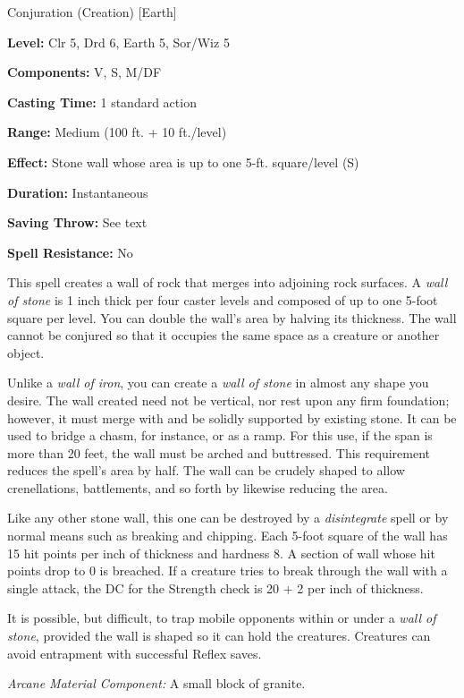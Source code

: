 
Conjuration (Creation) [Earth]

\textbf{Level:} Clr 5, Drd 6, Earth 5, Sor/Wiz 5

\textbf{Components:} V, S, M/DF

\textbf{Casting Time:} 1 standard action

\textbf{Range:} Medium (100 ft. + 10 ft./level)

\textbf{Effect:} Stone wall whose area is up to one 5-ft. square/level (S)

\textbf{Duration:} Instantaneous

\textbf{Saving Throw:} See text

\textbf{Spell Resistance:} No

This spell creates a wall of rock that merges into adjoining rock surfaces. A \textit{wall 
of stone} is 1 inch thick per four caster levels and composed of up to one 5-foot 
square per level. You can double the wall's area by halving its thickness. The 
wall cannot be conjured so that it occupies the same space as a creature or another 
object.

Unlike a \textit{wall of iron}, you can create a \textit{wall of stone} in almost 
any shape you desire. The wall created need not be vertical, nor rest upon any 
firm foundation; however, it must merge with and be solidly supported by existing 
stone. It can be used to bridge a chasm, for instance, or as a ramp. For this use, 
if the span is more than 20 feet, the wall must be arched and buttressed. This 
requirement reduces the spell's area by half. The wall can be crudely shaped to 
allow crenellations, battlements, and so forth by likewise reducing the area.

Like any other stone wall, this one can be destroyed by a \textit{disintegrate 
}spell or by normal means such as breaking and chipping. Each 5-foot square of 
the wall has 15 hit points per inch of thickness and hardness 8. A section of wall 
whose hit points drop to 0 is breached. If a creature tries to break through the 
wall with a single attack, the DC for the Strength check is 20 + 2 per inch of 
thickness.

It is possible, but difficult, to trap mobile opponents within or under a \textit{wall 
of stone}, provided the wall is shaped so it can hold the creatures. Creatures 
can avoid entrapment with successful Reflex saves.

\textit{Arcane Material Component:} A small block of granite.

